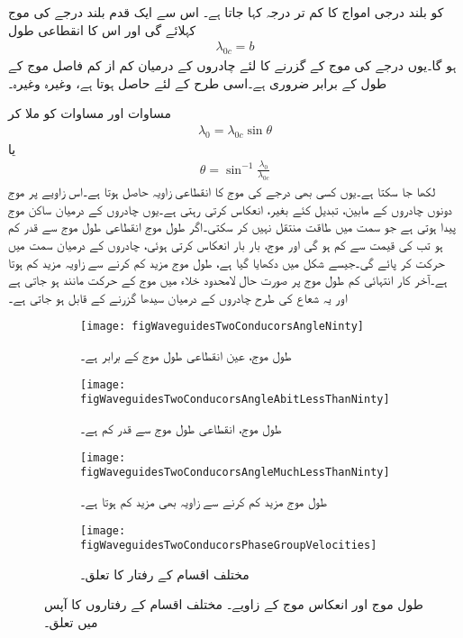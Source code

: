  کو بلند درجی  امواج کا کم تر درجہ کہا جاتا ہے۔ اس سے ایک قدم بلند  درجے کی موج کہلائے گی اور اس کا انقطاعی طول
\begin{align}
\lambda_{0c}=b
\end{align}
ہو گا۔یوں  درجے کی  موج کے گزرنے کا لئے چادروں کے درمیان کم از کم فاصل موج کے طول کے برابر ضروری ہے۔اسی طرح  کے لئے  حاصل ہوتا ہے، وغیرہ وغیرہ۔

مساوات  اور مساوات  کو ملا کر
\begin{align}
\lambda_0=\lambda_{0c} \sin \theta
\end{align}
یا
\begin{align}
\theta=\sin^{-1}\frac{\lambda_0}{\lambda_{0c}}
\end{align}
لکھا جا سکتا ہے۔یوں کسی بھی درجے کی موج کا انقطاعی زاویہ  حاصل ہوتا ہے۔اس زاویے پر موج  دونوں چادروں کے مابین،  تبدیل کئے بغیر،  انعکاس کرتی رہتی ہے۔یوں چادروں کے درمیان ساکن موج پیدا ہوتی ہے جو  سمت میں طاقت منتقل نہیں کر سکتی۔اگر طول موج  انقطاعی طول موج  سے قدر کم ہو تب  کی قیمت  سے کم ہو گی اور موج، بار بار انعکاس کرتی ہوئی، چادروں کے درمیان  سمت میں حرکت کر پائے گی۔جیسے شکل  میں دکھایا گیا ہے، طول موج مزید کم کرنے سے زاویہ مزید کم ہوتا ہے۔آخر کار انتہائی کم طول موج پر صورت حال لامحدود خلاء میں موج کے حرکت مانند ہو جاتی ہے اور یہ شعاع کی طرح چادروں کے درمیان سیدھا گزرنے کے قابل ہو جاتی ہے۔

\begin{figure}
\centering
\begin{subfigure}{0.4\textwidth}
\centering
\texttt{[image: figWaveguidesTwoConducorsAngleNinty]}
\caption{طول موج، عین انقطاعی طول موج کے برابر ہے۔}
\end{subfigure}%
%
\begin{subfigure}{0.4\textwidth}
\centering
\texttt{[image: figWaveguidesTwoConducorsAngleAbitLessThanNinty]}
\caption{طول موج، انقطاعی طول موج سے قدر کم ہے۔}
\end{subfigure}%

\begin{subfigure}{0.4\textwidth}
\centering
\texttt{[image: figWaveguidesTwoConducorsAngleMuchLessThanNinty]}
\caption{طول موج مزید کم کرنے سے زاویہ بھی مزید کم ہوتا ہے۔}
\end{subfigure}%
\begin{subfigure}{0.4\textwidth}
\centering
\texttt{[image: figWaveguidesTwoConducorsPhaseGroupVelocities]}
\caption{مختلف اقسام کے رفتار کا تعلق۔}
\end{subfigure}%
\caption{طول موج اور انعکاس موج کے زاویے۔ مختلف اقسام کے رفتاروں کا آپس میں تعلق۔}
\label{شکل_مویج_طول_موج_اور_زاویہ_انعاکس}
\end{figure}

